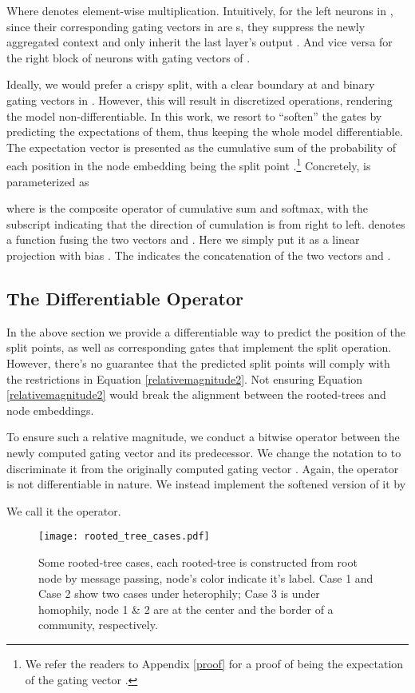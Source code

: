 \documentclass{article}
\begin{document}
Where  denotes element-wise multiplication. Intuitively, for the left  neurons in , since their corresponding gating vectors in  are s, they suppress the newly aggregated context  and only inherit the last layer's output . And vice versa for the right block of neurons with gating vectors of .

Ideally, we would prefer a crispy split, with a clear boundary at  and binary gating vectors in . However, this will result in discretized operations, rendering the model non-differentiable. In this work, we resort to ``soften'' the gates by predicting the expectations of them, thus keeping the whole model differentiable. The expectation vector  is presented as the cumulative sum of the probability of each position in the node embedding being the split point .\footnote{We refer the readers to Appendix \ref{proof} for a proof of  being the expectation of the gating vector .} Concretely,  is parameterized as

where  is the composite operator of cumulative sum and softmax, with the subscript  indicating that the direction of cumulation is from right to left.  denotes a function fusing the two vectors  and . Here we simply put it as a linear projection with bias . The  indicates the concatenation of the two vectors  and .


\subsection{The Differentiable  Operator}
In the above section we provide a differentiable way to predict the position of the split points, as well as corresponding gates that implement the split operation. However, there's no guarantee that the predicted split points will comply with the restrictions in Equation \ref{relativemagnitude2}. Not ensuring Equation \ref{relativemagnitude2} would break the alignment between the rooted-trees and node embeddings. 

To ensure such a relative magnitude, we conduct a bitwise  operator between the newly computed gating vector  and its predecessor. We change the notation to  to discriminate it from the originally computed gating vector . Again, the  operator is not differentiable in nature. We instead implement the softened version of it by 

We call it the  operator.


\begin{figure}\centering
\texttt{[image: rooted\_tree\_cases.pdf]}
\caption{Some rooted-tree cases, each rooted-tree is constructed from root node by message passing, node's color indicate it's label. Case 1 and Case 2 show two cases under heterophily; Case 3 is under homophily, node 1 \& 2 are at the center and the border of a community, respectively.}
\label{fig.showing_cases}
\end{figure}
\end{document}
